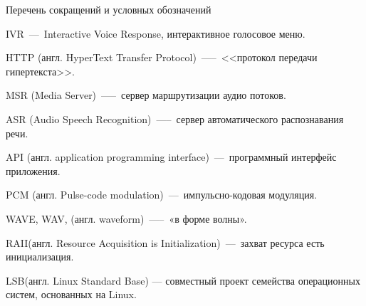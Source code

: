 \begin{center}
    Перечень сокращений и условных обозначений
\end{center}

\hypertarget{ivr}{IVR~---~Interactive Voice Response, интерактивное голосовое меню.}

\hypertarget{http}{HTTP (англ. HyperText Transfer Protocol)~—--~<<протокол передачи \\ \mbox{гипертекста}>>.}

\hypertarget{msr}{MSR (Media Server)~—--~сервер маршрутизации аудио потоков.}

\hypertarget{asr}{ASR (Audio Speech Recognition)~—--~сервер автоматического распознавания речи.}

\hypertarget{api}{API (англ. application programming interface)~---~программный интерфейс приложения.}

\hypertarget{pcm}{PCM (англ. Pulse-code modulation)~---~импульсно-кодовая модуляция.}

\hypertarget{wav}{WAVE, WAV, (англ. waveform)~—--~«в форме волны».}

\hypertarget{raii}{RAII(англ. Resource Acquisition is Initialization)~---~захват ресурса есть инициализация.}

\hypertarget{lsb}{LSB(англ. Linux Standard Base) — совместный проект семейства операционных систем, основанных на Linux.}

\clearpage
